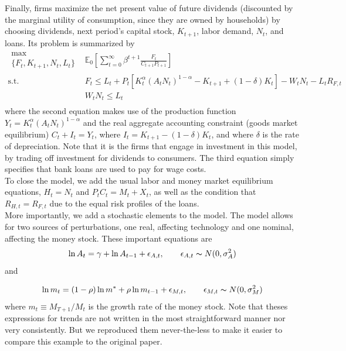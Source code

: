 Finally, firms maximize the net present value of future dividends (discounted by the marginal utility of consumption, since they are owned by households) by choosing dividends, next period's capital stock, $K_{t+1}$, labor demand, $N_t$, and loans. Its problem is summarized by
\begin{eqnarray*}
\substack{\max \\ \{F_t,K_{t+1},N_{t},L_t\}} & \mathbb{E}_0 \left[ \sum_{t=0}^\infty \beta^{t+1} \frac{F_t}{C_{t+1}P_{t+1}} \right] \\
\textrm{s.t.} & F_t \leq L_t + P_t \left[ K_t^\alpha (A_t N_t)^{1-\alpha} - K_{t+1} + (1-\delta)K_t \right] - W_tN_t-L_tR_{F,t} \\
& W_tN_t \leq L_t\\
\end{eqnarray*}
where the second equation makes use of the production function \mbox{$Y_t = K_t^\alpha (A_t N_t)^{1-\alpha}$} and the real aggregate accounting constraint (goods market equilibrium) \mbox{$C_t + I_t = Y_t$}, where $I_t=K_{t+1} - (1-\delta)K_t$, and where $\delta$ is the rate of depreciation. Note that it is the firms that engage in investment in this model, by trading off investment for dividends to consumers. The third equation simply specifies that bank loans are used to pay for wage costs. \\

To close the model, we add the usual labor and money market equilibrium equations, $H_t= N_t$ and $P_tC_t=M_t + X_t$, as well as the condition that $R_{H,t}=R_{F,t}$ due to the equal risk profiles of the loans.\\

More importantly, we add a stochastic elements to the model. The model allows for two sources of perturbations, one real, affecting technology and one nominal, affecting the money stock. These important equations are
\[
\ln A_t = \gamma + \ln A_{t-1} + \epsilon_{A,t}, \qquad \epsilon_{A,t} \thicksim N(0,\sigma_A^2)
\]
and

\[
\ln m_t = (1-\rho)\ln m^* + \rho \ln m_{t-1} + \epsilon_{M,t}, \qquad \epsilon_{M,t} \thicksim N(0,\sigma_M^2)
\]
where $m_t \equiv M_{T+1}/M_t$ is the growth rate of the money stock. Note that theses expressions for trends are not written in the most straightforward manner nor very consistently. But we reproduced them never-the-less to make it easier to compare this example to the original paper. \\

